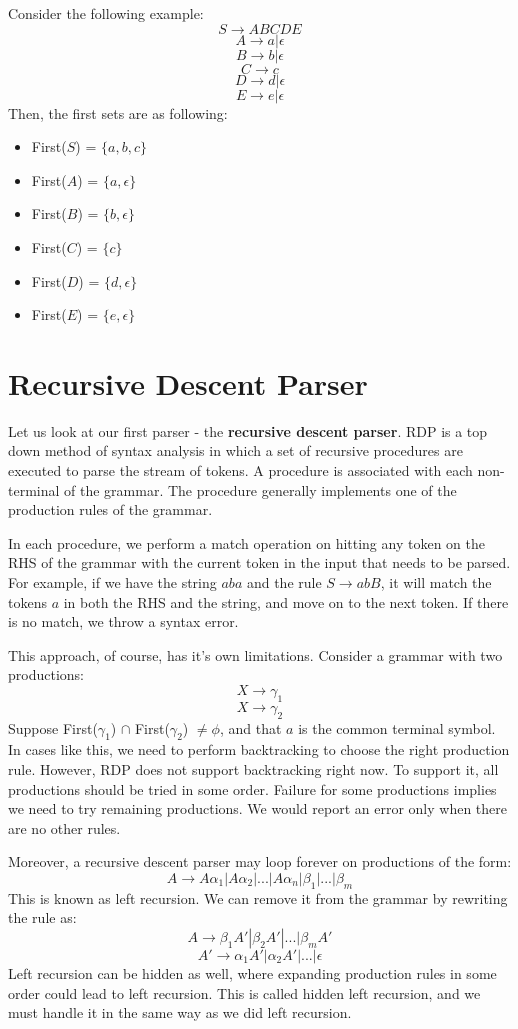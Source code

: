 \documentclass[12pt,letterpaper]{book}
\theoremstyle{definition}
\begin{document}
Consider the following example:
\[S \rightarrow ABCDE\]
\[A \rightarrow a|\epsilon\]
\[B \rightarrow b|\epsilon\]
\[C \rightarrow c\]
\[D \rightarrow d|\epsilon\]
\[E \rightarrow e|\epsilon\]
Then, the first sets are as following:
\begin{itemize}
  \item First($S$) = $\{a,b,c\}$
  \item First($A$) = $\{a,\epsilon\}$
  \item First($B$) = $\{b,\epsilon\}$
  \item First($C$) = $\{c\}$
  \item First($D$) = $\{d,\epsilon\}$
  \item First($E$) = $\{e,\epsilon\}$
\end{itemize}

\section{Recursive Descent Parser}

Let us look at our first parser - the \textbf{recursive descent parser}. RDP is a top down method of syntax analysis in which a set of recursive procedures are executed to parse the stream of tokens. A procedure is associated with each non-terminal of the grammar. The procedure generally implements one of the production rules of the grammar.

In each procedure, we perform a match operation on hitting any token on the RHS of the grammar with the current token in the input that needs to be parsed. For example, if we have the string $aba$ and the rule $S \rightarrow abB$, it will match the tokens $a$ in both the RHS and the string, and move on to the next token. If there is no match, we throw a syntax error.

This approach, of course, has it's own limitations. Consider a grammar with two productions:
\[X \rightarrow \gamma_1\]
\[X \rightarrow \gamma_2\]
Suppose First($\gamma_1$) $\cap$ First($\gamma_2$) $\neq \phi$, and that $a$ is the common terminal symbol. In cases like this, we need to perform backtracking to choose the right production rule. However, RDP does not support backtracking right now. To support it, all productions should be tried in some order. Failure for some productions implies we need to try remaining productions. We would report an error only when there are no other rules.

Moreover, a recursive descent parser may loop forever on productions of the form:
\[A \rightarrow A \alpha_1|A \alpha_2 | ... | A \alpha_n | \beta_1 | ... | \beta_m\]
This is known as left recursion. We can remove it from the grammar by rewriting the rule as:
\[A \rightarrow \beta_1 A' | \beta_2 A' | ... | \beta_m A'\]
\[A' \rightarrow \alpha_1 A'| \alpha_2 A' | ... | \epsilon\]
Left recursion can be hidden as well, where expanding production rules in some order could lead to left recursion. This is called hidden left recursion, and we must handle it in the same way as we did left recursion.
\end{document}
